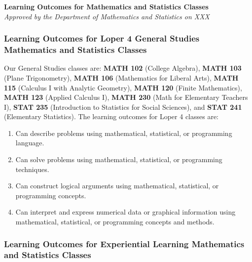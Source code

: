 \documentclass[11pt]{article}
\newenvironment{alphalist}{
\begin{enumerate}[label=(\arabic*),widest=107 ,leftmargin=25pt, itemsep=0pt]}
{\end{enumerate}}
\begin{document}
\begin{flushleft}
\textbf{Learning Outcomes for Mathematics and Statistics Classes} \\
\vspace{0.1in}
\emph{Approved by the Department of Mathematics and Statistics on XXX}
\end{flushleft}

\subsubsection*{Learning Outcomes for Loper 4 General Studies Mathematics and Statistics Classes}

Our General Studies classes are:
\textbf{MATH 102} (College Algebra),
\textbf{MATH 103} (Plane Trigonometry),
\textbf{MATH 106} (Mathematics for Liberal Arts),
\textbf{MATH 115} (Calculus I with Analytic Geometry),
\textbf{MATH 120} (Finite Mathematics),
\textbf{MATH 123} (Applied Calculus I),
\textbf{MATH 230} (Math for Elementary Teachers I),
\textbf{STAT 235} (Introduction to  Statistics for  Social Sciences),
and \textbf{STAT 241}  (Elementary Statistics). The learning outcomes for Loper 4  classes are:

\begin{alphalist}
\item Can describe problems using mathematical, statistical, or programming language.
\item Can solve problems using mathematical, statistical, or programming techniques.
\item Can construct logical arguments using mathematical, statistical, or programming concepts.
\item Can interpret and express numerical data or graphical information using 
   mathematical, statistical, or programming concepts and methods.
\end{alphalist}

\subsubsection*{Learning Outcomes for Experiential Learning Mathematics and Statistics Classes}
\end{document}

